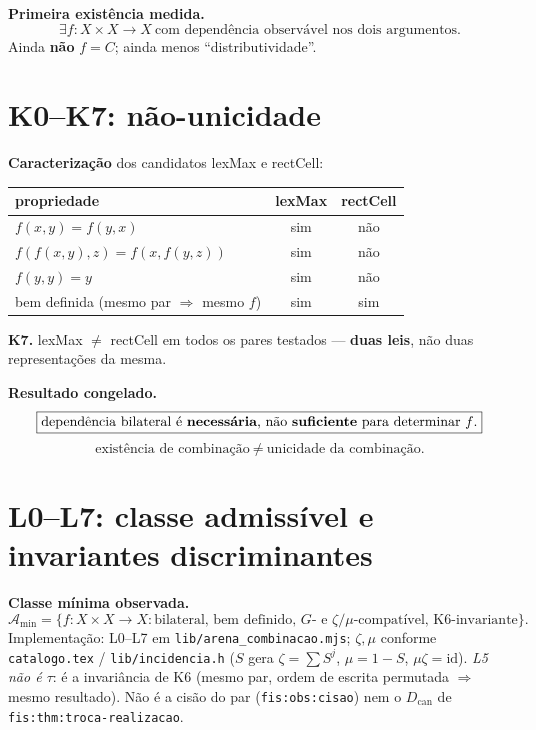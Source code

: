 \documentclass[11pt,a4paper]{article}
\newcommand{\code}[1]{\texttt{\small #1}}
\begin{document}
\medskip\noindent\textbf{Primeira existência medida.}
\[
\boxed{\exists f\colon X\times X\to X\ \text{com dependência observável nos dois argumentos.}}
\]
Ainda \textbf{não} $f=C$; ainda menos ``distributividade''.

\section{K0--K7: não-unicidade}\label{comb:k}

\noindent\textbf{Caracterização} dos candidatos lexMax e rectCell:
\begin{center}\footnotesize
\begin{tabular}{@{}lcc@{}}
\toprule
propriedade & lexMax & rectCell \\
\midrule
$f(x,y)=f(y,x)$ & sim & não \\
$f(f(x,y),z)=f(x,f(y,z))$ & sim & não \\
$f(y,y)=y$ & sim & não \\
bem definida (mesmo par $\Rightarrow$ mesmo $f$) & sim & sim \\
\bottomrule
\end{tabular}
\end{center}

\medskip\noindent\textbf{K7.} lexMax $\neq$ rectCell em todos os pares testados ---
\textbf{duas leis}, não duas representações da mesma.

\medskip\noindent\textbf{Resultado congelado.}
\[
\boxed{\text{dependência bilateral é \textbf{necessária}, não \textbf{suficiente}
para determinar $f$.}}
\]
\[
\boxed{\text{existência de combinação}\ \neq\ \text{unicidade da combinação.}}
\]

\section{L0--L7: classe admissível e invariantes discriminantes}\label{comb:l}

\noindent\textbf{Classe mínima observada.}
\[
\mathcal A_{\min}
=\bigl\{f\colon X\times X\to X:
\text{bilateral, bem definido, }G\text{- e }\zeta/\mu\text{-compatível,
K6-invariante}\bigr\}.
\]
Implementação: L0--L7 em \code{lib/arena\_combinacao.mjs}; $\zeta,\mu$ conforme
\code{catalogo.tex} / \code{lib/incidencia.h} ($S$ gera $\zeta=\sum S^j$, $\mu=1-S$,
$\mu\zeta=\mathrm{id}$).
\emph{L5 não é $\tau$}: é a invariância de K6 (mesmo par, ordem de escrita
permutada $\Rightarrow$ mesmo resultado). Não é a cisão do par
(\code{fis:obs:cisao}) nem o $D_{\mathrm{can}}$ de \code{fis:thm:troca-realizacao}.
\end{document}
